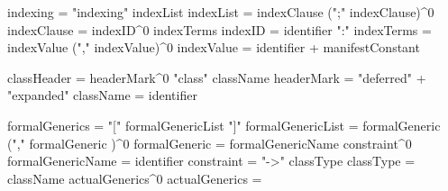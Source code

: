 indexing = "indexing" indexList
indexList = indexClause (";" indexClause)^0
indexClause = indexID^0 indexTerms
indexID = identifier ":"
indexTerms = indexValue ("," indexValue)^0
indexValue = identifier + manifestConstant

classHeader = headerMark^0 "class" className
headerMark = "deferred" + "expanded"
className = identifier

formalGenerics = "[" formalGenericList "]"
formalGenericList = formalGeneric ("," formalGeneric )^0
formalGeneric     = formalGenericName constraint^0
formalGenericName = identifier
constraint = "->" classType
classType = className actualGenerics^0
actualGenerics = 

\stoptyping

